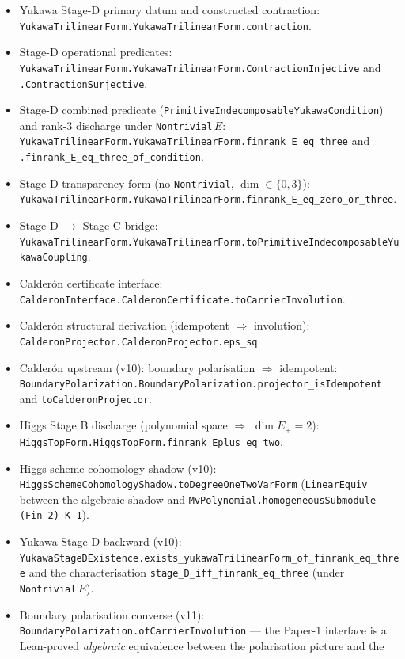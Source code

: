 \documentclass[11pt,a4paper]{article}
\begin{document}
\begin{tfptexports}
\begin{itemize}[leftmargin=1.5em, itemsep=0pt]
  \texttt{YukawaPrimitive.PrimitiveIndecomposableYukawaCoupling.toYukawaTopForm}.
\item Yukawa Stage-D primary datum and constructed contraction:
  \texttt{YukawaTrilinearForm.YukawaTrilinearForm.contraction}.
\item Stage-D operational predicates:
  \texttt{YukawaTrilinearForm.YukawaTrilinearForm.ContractionInjective} and \texttt{.ContractionSurjective}.
\item Stage-D combined predicate
  (\texttt{PrimitiveIndecomposableYukawaCondition}) and
  rank-3 discharge under \texttt{Nontrivial}\,$E$:
  \texttt{YukawaTrilinearForm.YukawaTrilinearForm.finrank\_E\_eq\_three}
  and \texttt{.finrank\_E\_eq\_three\_of\_condition}.
\item Stage-D transparency form (no \texttt{Nontrivial}, $\dim
  \in \{0,3\}$): \texttt{YukawaTrilinearForm.YukawaTrilinearForm.finrank\_E\_eq\_zero\_or\_three}.
\item Stage-D $\to$ Stage-C bridge:
  \texttt{YukawaTrilinearForm.YukawaTrilinearForm.toPrimitiveIndecomposableYukawaCoupling}.
\item Calderón certificate interface:
  \texttt{CalderonInterface.CalderonCertificate.toCarrierInvolution}.
\item Calderón structural derivation (idempotent $\Rightarrow$
  involution): \texttt{CalderonProjector.CalderonProjector.eps\_sq}.
\item Calderón upstream (v10): boundary polarisation $\Rightarrow$
  idempotent:
  \texttt{BoundaryPolarization.BoundaryPolarization.projector\_isIdempotent}
  and \texttt{toCalderonProjector}.
\item Higgs Stage B discharge (polynomial space $\Rightarrow$
  $\dim E_+ = 2$):
  \texttt{HiggsTopForm.HiggsTopForm.finrank\_Eplus\_eq\_two}.
\item Higgs scheme-cohomology shadow (v10):
  \texttt{HiggsSchemeCohomologyShadow.toDegreeOneTwoVarForm}
  (\texttt{LinearEquiv} between the algebraic shadow and
  \texttt{MvPolynomial.homogeneousSubmodule (Fin 2) K 1}).
\item Yukawa Stage D backward (v10):
  \texttt{YukawaStageDExistence.exists\_yukawaTrilinearForm\_of\_finrank\_eq\_three}
  and the characterisation
  \texttt{stage\_D\_iff\_finrank\_eq\_three} (under
  \texttt{Nontrivial}\,$E$).
\item Boundary polarisation converse (v11):
  \texttt{BoundaryPolarization.ofCarrierInvolution}
  --- the Paper-1 interface is a Lean-proved \emph{algebraic}
  equivalence between the polarisation picture and the

\end{itemize}
\end{tfptexports}
\end{document}
